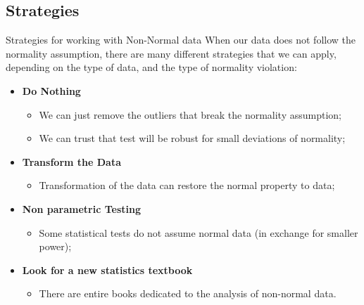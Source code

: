 
\subsection{Strategies}
\begin{frame}{Strategies for working with Non-Normal data}
  When our data does not follow the normality assumption, there are many different strategies that we can apply, depending on the type of data, and the type of normality violation:\bigskip

  \begin{itemize}
    \item {\bf Do Nothing}
    \begin{itemize}
      \item We can just remove the outliers that break the normality assumption;
      \item We can trust that test will be robust for small deviations of normality;
    \end{itemize}
    \item {\bf Transform the Data}
      \begin{itemize}
        \item Transformation of the data can restore the normal property to data;
      \end{itemize}
    \item {\bf Non parametric Testing}
    \begin{itemize}
      \item Some statistical tests do not assume normal data (in exchange for smaller power);
    \end{itemize}
    \item {\bf Look for a new statistics textbook}
    \begin{itemize}
      \item There are entire books dedicated to the analysis of non-normal data.
    \end{itemize}
  \end{itemize}\bigskip

\end{frame}

